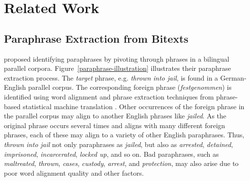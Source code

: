 \documentclass[11pt]{article}
\begin{document}


%


\section{Related Work}
\subsection{Paraphrase Extraction from Bitexts}

  proposed identifying paraphrases by pivoting through phrases in a bilingual parallel corpora. 
Figure~\ref{paraphrase-illustration} illustrates their paraphrase extraction process. The \emph{target} phrase, e.g. {\it thrown into jail}, is found in a German-English parallel corpus.  The corresponding foreign phrase ({\it festgenommen}) is identified using word alignment and phrase extraction techniques from phrase-based statistical machine translation \cite{KoehnEtAl03}.  Other occurrences of the foreign phrase in the parallel corpus may align to another English phrases like {\it jailed}.  
%
As the original phrase occurs several times and aligns with many different foreign phrases, each of these may align to a variety of other English paraphrases.  Thus, {\it thrown into jail} not only paraphrases as {\it jailed}, but also as {\it arrested}, {\it detained}, {\it imprisoned}, {\it incarcerated}, {\it locked up}, and so on.
Bad paraphrases, such as
 {\it maltreated}, {\it thrown}, {\it cases}, {\it custody}, {\it arrest}, and {\it protection}, may also arise due to poor word alignment quality and other factors.
\end{document}
